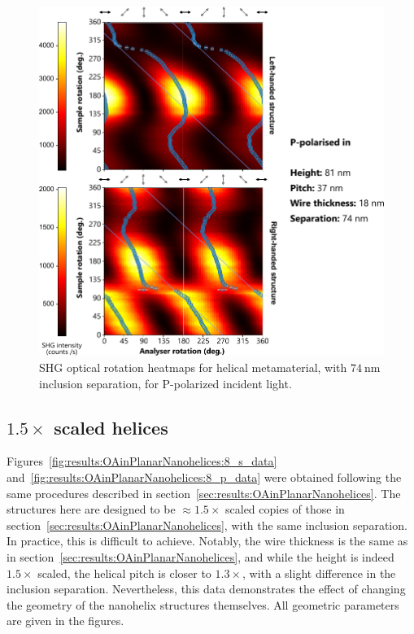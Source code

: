 \begin{figure}[htb!]	
    \centering	
    \includegraphics[scale=1]{./figures/results/OAinPlanarNanohelices/b_p_data.pdf}

    \caption{\label{fig:results:OAinPlanarNanohelices:b_p_data}
    SHG optical rotation heatmaps for helical metamaterial, with $\SI{74}{\nano\m}$ inclusion separation, for P-polarized incident light.}	
\end{figure}

\subsection{$1.5 \times$ scaled helices}
Figures~\ref{fig:results:OAinPlanarNanohelices:8_s_data} and~\ref{fig:results:OAinPlanarNanohelices:8_p_data} were obtained following the same procedures described in section~\ref{sec:results:OAinPlanarNanohelices}. The structures here are designed to be $\approx 1.5 \times$ scaled copies of those in section~\ref{sec:results:OAinPlanarNanohelices}, with the same inclusion separation. In practice, this is difficult to achieve. Notably, the wire thickness is the same as in section~\ref{sec:results:OAinPlanarNanohelices}, and while the height is indeed $1.5 \times$ scaled, the helical pitch is closer to $1.3 \times$, with a slight difference in the inclusion separation.  Nevertheless, this data demonstrates the effect of changing the geometry of the nanohelix structures themselves. All geometric parameters are given in the  figures.

